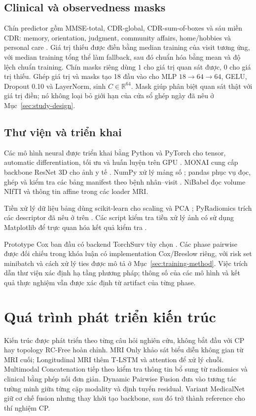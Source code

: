 \subsection{Clinical và observedness masks}
Chín predictor gồm MMSE-total, CDR-global, CDR-sum-of-boxes và sáu miền CDR: memory, orientation, judgment, community affairs, home/hobbies và personal care \cite{folstein1975mmse,morris1993cdr}. Giá trị thiếu được điền bằng median training của visit tương ứng, với median training tổng thể làm fallback, sau đó chuẩn hóa bằng mean và độ lệch chuẩn training. Chín masks riêng dùng $1$ cho giá trị quan sát được, $0$ cho giá trị thiếu. Ghép giá trị và masks tạo 18 đầu vào cho MLP $18\to64\to64$, GELU, Dropout 0.10 và LayerNorm, sinh $C\in\mathbb R^{64}$. Mask giúp phân biệt quan sát thật với giá trị điền; nó không loại bỏ giới hạn của cửa sổ ghép ngày đã nêu ở Mục~\ref{sec:study-design}.

\subsection{Thư viện và triển khai}
Các mô hình neural được triển khai bằng Python và PyTorch cho tensor, automatic differentiation, tối ưu và huấn luyện trên GPU \cite{paszke2019pytorch}. MONAI cung cấp backbone ResNet 3D cho ảnh y tế \cite{cardoso2022monai}. NumPy xử lý mảng số \cite{harris2020numpy}; pandas phục vụ đọc, ghép và kiểm tra các bảng manifest theo bệnh nhân--visit \cite{mckinney2010pandas}. NiBabel đọc volume NIfTI và thông tin affine trong các loader MRI.

Tiền xử lý dữ liệu bảng dùng scikit-learn cho scaling và PCA \cite{pedregosa2011sklearn}; PyRadiomics trích các descriptor đã nêu ở trên \cite{vangriethuysen2017computational}. Các script kiểm tra tiền xử lý ảnh có sử dụng Matplotlib để trực quan hóa kết quả kiểm tra \cite{hunter2007matplotlib}.

Prototype Cox ban đầu có backend TorchSurv tùy chọn \cite{monod2024torchsurv}. Các phase pairwise được đối chiếu trong khóa luận có implementation Cox/Breslow riêng, với risk set minibatch và cách xử lý ties được mô tả ở Mục~\ref{sec:training-method}. Việc trích dẫn thư viện xác định hạ tầng phương pháp; thông số của các mô hình và kết quả thực nghiệm vẫn được xác định từ artifact của từng phase.

\section{Quá trình phát triển kiến trúc}
\label{sec:architecture-evolution}
Kiến trúc được phát triển theo từng câu hỏi nghiên cứu, không bắt đầu với CP hay topology RC-Free hoàn chỉnh. MRI Only khảo sát biểu diễn không gian từ MRI cuối; Longitudinal MRI thêm T-LSTM và attention để xử lý chuỗi. Multimodal Concatenation tiếp theo kiểm tra thông tin bổ sung từ radiomics và clinical bằng phép nối đơn giản. Dynamic Pairwise Fusion đưa vào tương tác tường minh giữa từng cặp modality và định tuyến residual. Variant MedicalNet giữ cơ chế fusion nhưng thay khởi tạo backbone, sau đó trở thành reference cho thí nghiệm CP.

